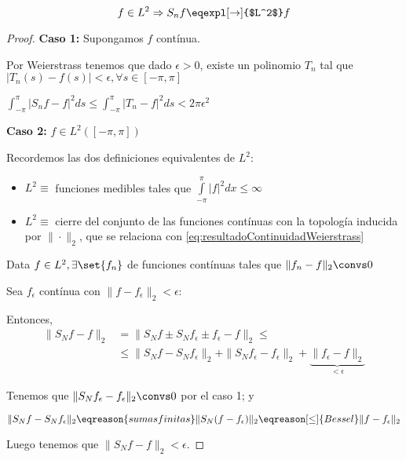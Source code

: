 		\begin{theorem} \label{thm:ConvergenciaL2Limite}

			\[ f \in L^2 \Rightarrow S_n f \eqexpl[\rightarrow]{$L^2$} f \]

		\end{theorem}

		\begin{proof}

			\textbf{Caso 1:} Supongamos $f$ contínua.

			Por Weierstrass tenemos que dado $\epsilon > 0$, existe un polinomio $T_n$ tal que $|T_n(s) - f(s)| < \epsilon, \forall s \in [-\pi,\pi]$

			\(
				\int^{\pi}_{-\pi} | S_n f - f |^2 ds \leq \int^\pi_{-\pi} | T_n - f |^2 ds < 2 \pi \epsilon^2 \label{eq:resultadoContinuidadWeierstrass}
			\)

			\textbf{Caso 2:} $f \in L^2 ([-\pi,\pi])$

			Recordemos las dos definiciones equivalentes de $L^2$:
			\begin{itemize}

				\item $L^2 \equiv$ funciones medibles tales que $\int\limits^\pi_{-\pi} |f|^2 dx \leq \infty $

				\item $L^2 \equiv$ cierre del conjunto de las funciones contínuas con la topología inducida por $\|\cdot\|_2$, que se relaciona con \ref{eq:resultadoContinuidadWeierstrass}

			\end{itemize}

			Data $f\in L^2, \exists \set{f_n}$ de funciones contínuas tales que $\|f_n - f\|_2 \convs 0$

			Sea $f_\epsilon$ contínua con $\|f-f_\epsilon\|_2 < \epsilon$:

			Entonces,
			\begin{align*}
			\| S_N f - f \|_2 &= \| S_N f \pm S_N f_\epsilon \pm f_\epsilon - f \|_2 \leq \\
			& \leq \| S_N f - S_N f_\epsilon \|_2 + \| S_N f_\epsilon - f_\epsilon \|_2 + \underbrace{\| f_\epsilon - f \|_2}_{< \epsilon}
			\end{align*}

			Tenemos que $\| S_N f_\epsilon - f_\epsilon \|_2 \convs 0$ por el caso 1; y

			\[ \| S_N f - S_N f_\epsilon \|_2 \eqreason{sumas finitas} \| S_N (f - f_\epsilon) \|_2 \eqreason[\leq]{Bessel} \| f - f_\epsilon \|_2 \]

			Luego tenemos que $\| S_N f - f \|_2 < \epsilon$.

		\end{proof}

